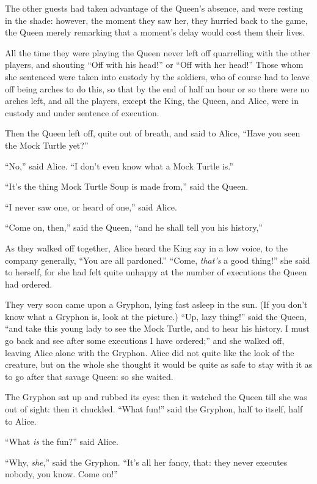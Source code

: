 \documentclass[book, 20pt]{extbook}
\begin{document}
The other guests had taken advantage of the Queen's absence, and were
resting in the shade: however, the moment they saw her, they hurried
back to the game, the Queen merely remarking that a moment's delay would
cost them their lives.

All the time they were playing the Queen never left off quarrelling with
the other players, and shouting ``Off with his head!'' or ``Off with her
head!'' Those whom she sentenced were taken into custody by the
soldiers, who of course had to leave off being arches to do this, so
that by the end of half an hour or so there were no arches left, and all
the players, except the King, the Queen, and Alice, were in custody and
under sentence of execution.

Then the Queen left off, quite out of breath, and said to Alice, ``Have
you seen the Mock Turtle yet?''

``No,'' said Alice. ``I don't even know what a Mock Turtle is.''

``It's the thing Mock Turtle Soup is made from,'' said the Queen.

``I never saw one, or heard of one,'' said Alice.

``Come on, then,'' said the Queen, ``and he shall tell you his
history,''

As they walked off together, Alice heard the King say in a low voice, to
the company generally, ``You are all pardoned.'' ``Come, \emph{that's} a
good thing!'' she said to herself, for she had felt quite unhappy at the
number of executions the Queen had ordered.

They very soon came upon a Gryphon, lying fast asleep in the sun. (If
you don't know what a Gryphon is, look at the picture.) ``Up, lazy
thing!'' said the Queen, ``and take this young lady to see the Mock
Turtle, and to hear his history. I must go back and see after some
executions I have ordered;'' and she walked off, leaving Alice alone
with the Gryphon. Alice did not quite like the look of the creature, but
on the whole she thought it would be quite as safe to stay with it as to
go after that savage Queen: so she waited.

The Gryphon sat up and rubbed its eyes: then it watched the Queen till
she was out of sight: then it chuckled. ``What fun!'' said the Gryphon,
half to itself, half to Alice.

``What \emph{is} the fun?'' said Alice.

``Why, \emph{she},'' said the Gryphon. ``It's all her fancy, that: they
never executes nobody, you know. Come on!''
\end{document}
